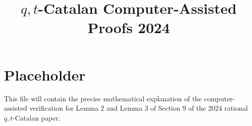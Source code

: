 \documentclass{article}
\title{\texorpdfstring{$q,t$}{qt}-Catalan Computer-Assisted Proofs 2024}
\author{}
\date{}
\begin{document}
\maketitle

\section{Placeholder}

This file will contain the precise mathematical explanation of the
computer-assisted verification for Lemma 2 and Lemma 3 of Section 9 of the
2024 rational \(q,t\)-Catalan paper.
\end{document}
